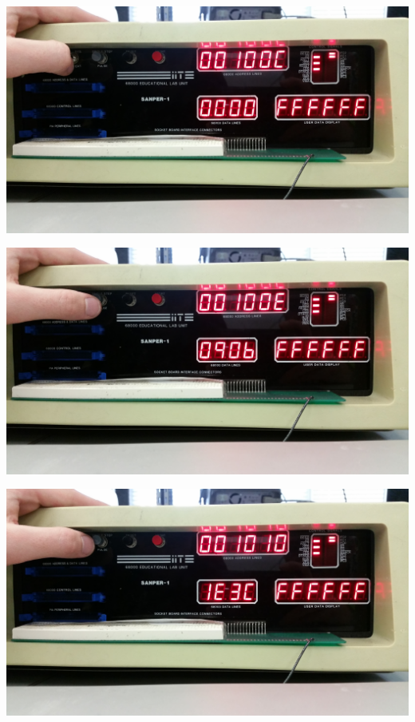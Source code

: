 \documentclass[12pt, twocolumn]{article}
\begin{document}
\begin{center}
\includegraphics[width=1\linewidth]{Lab1/20150120_093610}
\end{center}
\begin{center}
\includegraphics[width=1\linewidth]{Lab1/20150120_093612}
\end{center}
\begin{center}
\includegraphics[width=1\linewidth]{Lab1/20150120_093614}
\end{center}
\end{document}
